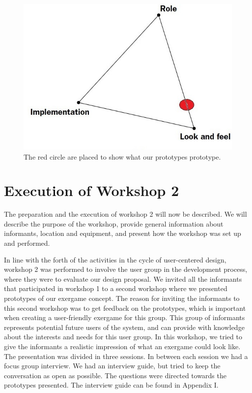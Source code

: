 \begin{figure} [H]
\centering
\includegraphics[scale=0.4]{prototypemodelDobbel}
\caption[Prototype model placing our prototype]{The red circle are placed to show what our prototypes prototype.}
\label{fig:prototype2}
\end{figure}

 
\section{Execution of Workshop 2}
\label{sec:ws2}
The preparation and the execution of workshop 2 will now be described. We will describe the purpose of the workshop, provide general information about informants, location and equipment, and present how the workshop was set up and performed. 

In line with the forth of the activities in the cycle of user-centered design, workshop 2 was performed to involve the user group in the development process, where they were to evaluate our design proposal. We invited all the informants that participated in workshop 1 to a second workshop where we presented prototypes of our exergame concept. The reason for inviting the informants to this second workshop was to get feedback on the prototypes, which is important when creating a user-friendly exergame for this group. This group of informants represents potential future users of the system, and can provide with knowledge about the interests and needs for this user group. In this workshop, we tried to give the informants a realistic impression of what an exergame could look like. The presentation was divided in three sessions. In between each session we had a focus group interview. We had an interview guide, but tried to keep the conversation as open as possible. The questions were directed towards the prototypes presented. The interview guide can be found in Appendix I.

